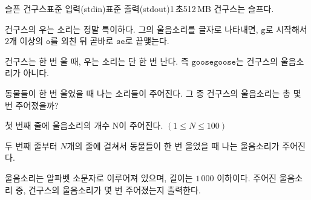 \begin{problem}{슬픈 건구스}{표준 입력(stdin)}{표준 출력(stdout)}{1\,초}{512\,MB}
건구스는 슬프다.

건구스의 우는 소리는 정말 특이하다. 그의 울음소리를 글자로 나타내면, $\texttt{g}$로 시작해서 $2$개 이상의 $\texttt{o}$를 외친 뒤 곧바로 $\texttt{se}$로 끝맺는다.

건구스는 한 번 울 때, 우는 소리는 단 한 번 난다. 즉 $\texttt{goosegoose}$는 건구스의 울음소리가 아니다.

동물들이 한 번 울었을 때 나는 소리들이 주어진다. 그 중 건구스의 울음소리는 총 몇 번 주어졌을까?

\InputFile
첫 번째 줄에 울음소리의 개수 N이 주어진다. $(1 \le N \le 100)$

두 번째 줄부터 $N$개의 줄에 걸쳐서 동물들이 한 번 울었을 때 나는 울음소리가 주어진다.

울음소리는 알파벳 소문자로 이루어져 있으며, 길이는 $1\,000$ 이하이다.
\OutputFile
주어진 울음소리 중, 건구스의 울음소리가 몇 번 주어졌는지 출력한다.
\Examples

\begin{example}
%
\end{example}

\end{problem}
